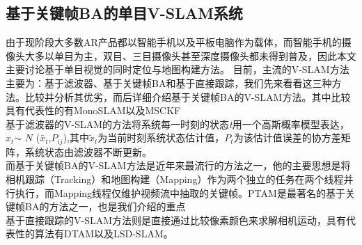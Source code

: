\subsection{基于关键帧BA的单目V-SLAM系统}
由于现阶段大多数AR产品都以智能手机以及平板电脑作为载体，而智能手机的摄像头大多以单目为主，双目、三目摄像头甚至深度摄像头都未得到普及，因此本文主要讨论基于单目视觉的同时定位与地图构建方法。
目前，主流的V-SLAM方法主要为：基于滤波器、基于关键帧BA和基于直接跟踪，我们先来看看这三种方法。比较并分析其优劣，而后详细介绍基于关键帧BA的V-SLAM方法。其中比较具有代表性的有MonoSLAM以及MSCKF\\
基于滤波器的V-SLAM的方法将系统每一时刻的状态\textit{t}用一个高斯概率模型表达，$x_t$$\sim$ $\mathrm{\textit{N}}$ ($\tilde{x_{t}}$,$\mathrm{\textit{P}}_{ij}$),其中$\tilde{x}_t$为当前时刻系统状态估计值，$P_t$为该估计值误差的协方差矩阵，系统状态由滤波器不断更新。\\
而基于关键帧BA的V-SLAM方法是近年来最流行的方法之一，他的主要思想是将相机跟踪（Tracking）和地图构建（Mapping）作为两个独立的任务在两个线程并行执行，而Mapping线程仅维护视频流中抽取的关键帧。PTAM是最著名的基于关键帧BA的方法之一，也是我们介绍的重点\\
基于直接跟踪的V-SLAM方法则是直接通过比较像素颜色来求解相机运动，具有代表性的算法有DTAM以及LSD-SLAM。